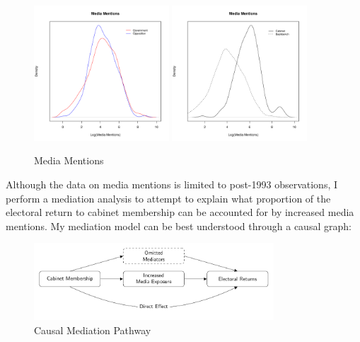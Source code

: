 \documentclass[letter,12pt]{article}
\begin{document}
\begin{figure}
\centering
\caption{Media Mentions}
\includegraphics[width=0.45\textwidth]{"Includes/media_govopp"}
\includegraphics[width=0.45\textwidth]{"Includes/media_cabinet"}
\end{figure}

Although the data on media mentions is limited to post-1993 observations, I perform a mediation analysis to attempt to explain what proportion of the electoral return to cabinet membership can be accounted for by increased media mentions. My mediation model can be best understood through a causal graph:

\begin{figure}
\centering
\caption{Causal Mediation Pathway}
	\includegraphics[width = 0.8\textwidth]{Includes/flowchart}
\end{figure}
\end{document}

